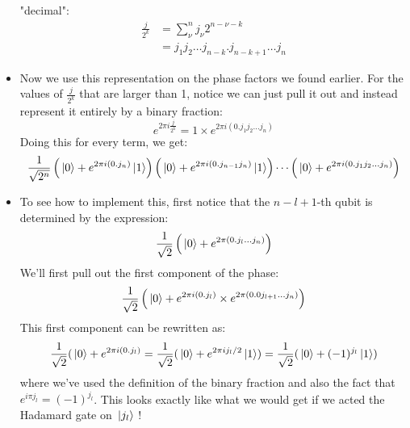 \begin{itemize}
		"decimal":
		\begin{align*}
			\frac{j}{2^{k}} &= \sum_{\nu}^{n}j_{\nu}2^{n - \nu - k} \\
			&= j_1j_2\dots j_{n-k}.j_{n-k+1}\dots j_n 
		\end{align*}
	\item Now we use this representation on the phase factors we found earlier. For the values of 
		\( \frac{j}{2^{k}} \) that are larger than 1, notice we can just pull it out and instead represent it 
		entirely by a binary fraction:
		\[
		e^{2 \pi i \frac{j}{2^{k}}} = 1\times e^{2 \pi i (0.j_1j_2\dots j_n)}
		\] 
		Doing this for every term, we get:
		\[
		\frac{1}{\sqrt{2^{n}} }\left( \ket*{0} + e^{2 \pi i (0.j_n)}\ket*{1} \right) 
		\left( \ket*{0} + e^{2 \pi i (0.j_{n-1}j_n)}\ket*{1} \right) \cdots 
		\left( \ket*{0} + e^{2 \pi i (0.j_1j_2\dots j_n)} \right) 
		\] 
	\item To see how to implement this, first notice that the \( n - l + 1 \)-th qubit is determined by 
		the expression: 
		\[
		\frac{1}{\sqrt{2} }\left( \ket*{0} + e^{2 \pi (0.j_l \dots j_n)} \right) 
		\] 
		We'll first pull out the first component of the phase:
		\[
		\frac{1}{\sqrt{2} }\left( \ket*{0} + e^{2 \pi i (0.j_l)} \times e^{ 2 \pi (0.0 j_{l + 1} \dots j_n)} \right) 
		\] 
		This first component can be rewritten as:
		\[
		\frac{1}{\sqrt{2} }(\ket*{0} + e^{2 \pi i (0.j_l)} = \frac{1}{\sqrt{2} }
		(\ket*{0} + e^{2 \pi i j_l / 2} \ket*{1}) = \frac{1}{\sqrt{2} }(\ket*{0} + (-1)^{j_l}\ket*{1})
		\] 
		where we've used the definition of the binary fraction and also the fact that \( e^{i\pi j_l} = (-1)^{j_l} \).
		This looks exactly like what we would get if we acted the Hadamard gate on \( \ket*{j_l} \) ! 


\end{itemize}
